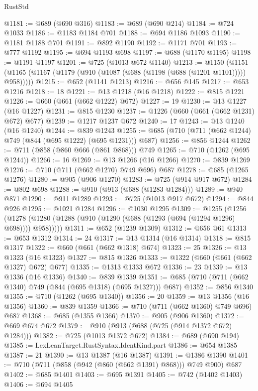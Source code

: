 \begin{lexlean}{RustStd}
\begin{coremodule}
@1181 := @689 (@690 @316)
@1183 := @689 (@690 @214)
@1184 := @724 @1033
@1186 := @1183 @1184 @701
@1188 := @694 @1186 @1093
@1190 := @1181 @1188 @701
@1191 := @892 @1190
@1192 := @1171 @701
@1193 := @777 @1192
@1195 := @694 @1193 @698
@1197 := @688 (@1170 @1195)
@1198 := @1191 @1197
@1201 := @725 (@1013 @672 @1140)
@1213 := @1150
    (@1151 (@1165 (@1167 (@1179 (@910 (@1087 (@688 (@1198 (@688 (@1201 @1101))))) @958)))))
@1215 := @652 (@1141 @1213)
@1216 := @656 @145
@1217 := @653 @1216
@1218 := 18
@1221 := @13 @1218 (@16 @1218)
@1222 := @815 @1221
@1226 := @660 (@661 (@662 @1222) @672)
@1227 := 19
@1230 := @13 @1227 (@16 @1227)
@1231 := @815 @1230
@1237 := @1226 (@660 (@661 (@662 @1231) @672) @677)
@1239 := @1217 @1237 @672
@1240 := 17
@1243 := @13 @1240 (@16 @1240)
@1244 := @839 @1243
@1255 := @685 (@710 (@711 (@662 @1244) @749 (@844 (@695 @1222) (@695 @1231))) @687)
@1256 := @856 @1244
@1262 := @711 (@858 (@860 @666 (@861 @868))) @749
@1265 := @710 (@1262 (@695 @1244))
@1266 := 16
@1269 := @13 @1266 (@16 @1266)
@1270 := @839 @1269
@1276 := @710 (@711 (@662 @1270) @749 @696) @687
@1278 := @685 (@1265 @1276)
@1280 := @905 (@906 @1270)
@1283 := @725 (@914 @917 @672)
@1284 := @802 @698
@1288 := @910 (@913 (@688 (@1283 @1284)))
@1289 := @940 @871
@1290 := @911 @1289
@1293 := @725 (@1013 @917 @672)
@1294 := @844 @926
@1295 := @1021 @1284
@1296 := @1030 @1295
@1309 := @1255
    (@1256 (@1278 (@1280 (@1288 (@910 (@1290 (@688 (@1293 (@694 (@1294 @1296) @698)))) @958)))))
@1311 := @652 (@1239 @1309)
@1312 := @656 @61
@1313 := @653 @1312
@1314 := 24
@1317 := @13 @1314 (@16 @1314)
@1318 := @815 @1317
@1322 := @660 (@661 (@662 @1318) @674)
@1323 := 25
@1326 := @13 @1323 (@16 @1323)
@1327 := @815 @1326
@1333 := @1322 (@660 (@661 (@662 @1327) @672) @677)
@1335 := @1313 @1333 @672
@1336 := 23
@1339 := @13 @1336 (@16 @1336)
@1340 := @839 @1339
@1351 := @685 (@710 (@711 (@662 @1340) @749 (@844 (@695 @1318) (@695 @1327))) @687)
@1352 := @856 @1340
@1355 := @710 (@1262 (@695 @1340))
@1356 := 20
@1359 := @13 @1356 (@16 @1356)
@1360 := @839 @1359
@1366 := @710 (@711 (@662 @1360) @749 @696) @687
@1368 := @685 (@1355 @1366)
@1370 := @905 (@906 @1360)
@1372 := @669 @674 @672
@1379 := @910 (@913 (@688 (@725 (@914 @1372 @672) @1284)))
@1382 := @725 (@1013 @1372 @672)
@1384 := @689 (@690 @194)
@1385 := LexLeanTarget.RustSyntax.IdentKind.part
@1386 := @654 @1385
@1387 := 21
@1390 := @13 @1387 (@16 @1387)
@1391 := @1386 @1390
@1401 := @710 (@711 (@858 (@942 (@860 (@662 @1391) @868))) @749 @900) @687
@1402 := @685 @1401
@1403 := @695 @1391
@1405 := @742 (@1402 @1403)
@1406 := @694 @1405

\end{coremodule}
\end{lexlean}
